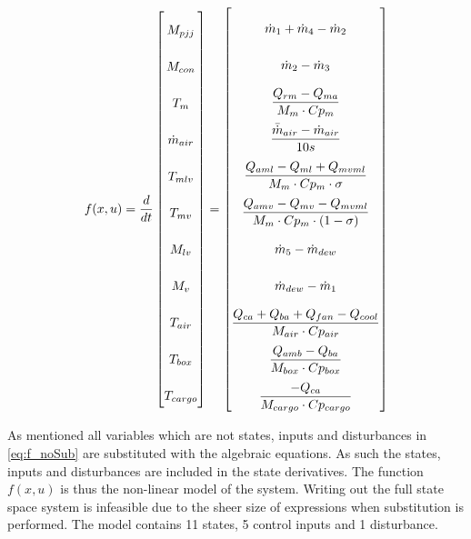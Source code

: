 \begin{equation} \label{eq:f_noSub} \renewcommand{\arraystretch}{2.4}
	f(x,u) =  \dfrac{d}{dt} \begin{bmatrix}
		M_{pjj}			\\				%
		M_{con} 		\\				%
		T_m 			\\				%
		\dot{m}_{air}	\\				%
		T_{mlv}			\\				%
		T_{mv}			\\				%
		M_{lv}			\\				%
		M_v				\\				%
		T_{air}			\\				%
		T_{box}			\\				%
		T_{cargo}		\\				%

	\end{bmatrix}
	=
	\begin{bmatrix}
		\dot{m}_1 + \dot{m}_4 - \dot{m}_2 \\										%
		\dot{m}_{2} - \dot{m}_{3}	\\												%
		\dfrac{Q_{rm} - Q_{ma}}{M_m \cdot Cp_m} \\									%
		\dfrac{\bar{\dot{m}}_{air}  - \dot{m}_{air}} {10s}		\\					%
		\dfrac{Q_{aml}-Q_{ml} + Q_{mvml}}{M_m \cdot Cp_m \cdot \sigma}        \\	%
		\dfrac{Q_{amv} - Q_{mv} - Q_{mvml}}{M_m \cdot Cp_m \cdot (1- \sigma)}	\\	%
		\dot{m}_{5} - \dot{m}_{dew}		\\											%
		\dot{m}_{dew} - \dot{m}_{1}	\\												%
		\dfrac{Q_{ca} + Q_{ba} + Q_{fan} -Q_{cool}}{M_{air} \cdot Cp_{air}} \\		%
		\dfrac{Q_{amb} - Q_{ba}}{M_{box} \cdot Cp_{box}} \\							%
		\dfrac{-Q_{ca}}{M_{cargo} \cdot Cp_{cargo}}									%
	\end{bmatrix}
\end{equation}


As mentioned all variables which are not states, inputs and disturbances in \cref{eq:f_noSub} are substituted with the algebraic equations. As such the states, inputs and disturbances are included in the state derivatives. The function $f(x,u)$ is thus the non-linear model of the system. Writing out the full state space system is infeasible due to the sheer size of expressions when substitution is performed. The model contains 11 states, 5 control inputs and 1 disturbance.

